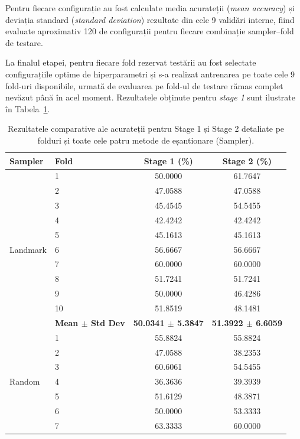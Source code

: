 Pentru fiecare configurație au fost calculate media acurateții (\textit{mean accuracy}) și deviația standard (\textit{standard deviation}) rezultate din cele 9 validări interne, fiind evaluate aproximativ 120 de configurații pentru fiecare combinație sampler--fold de testare.

La finalul etapei, pentru fiecare fold rezervat testării au fost selectate configurațiile optime de hiperparametri și s-a realizat antrenarea pe toate cele 9 fold-uri disponibile, urmată de evaluarea pe fold-ul de testare rămas complet nevăzut până în acel moment. Rezultatele obținute pentru \textit{stage 1} sunt ilustrate în Tabela~\ref{tab:combined_stages_results}.

\begin{table}[htbp]
	\centering
	\caption{Rezultatele comparative ale acurateții pentru Stage 1 și Stage 2 detaliate pe folduri și toate cele patru metode de eșantionare (Sampler).}
	\label{tab:combined_stages_results}
	\small
	\begin{tabular}{llcc}
		\toprule
		\textbf{Sampler} & \textbf{Fold} & \textbf{Stage 1 (\%)} & \textbf{Stage 2 (\%)} \\
		\midrule
		\multirow{11}{*}{Landmark} 
		& 1  & 50.0000 & 61.7647 \\
		& 2  & 47.0588 & 47.0588 \\
		& 3  & 45.4545 & 54.5455 \\
		& 4  & 42.4242 & 42.4242 \\
		& 5  & 45.1613 & 45.1613 \\
		& 6  & 56.6667 & 56.6667 \\
		& 7  & 60.0000 & 60.0000 \\
		& 8  & 51.7241 & 51.7241 \\
		& 9  & 50.0000 & 46.4286 \\
		& 10 & 51.8519 & 48.1481 \\
		\cmidrule{2-4}
		& \textbf{Mean $\pm$ Std Dev} & \textbf{50.0341 $\pm$ 5.3847} & \textbf{51.3922 $\pm$ 6.6059} \\
		\midrule
		\multirow{11}{*}{Random} 
		& 1  & 55.8824 & 55.8824 \\
		& 2  & 47.0588 & 38.2353 \\
		& 3  & 60.6061 & 54.5455 \\
		& 4  & 36.3636 & 39.3939 \\
		& 5  & 51.6129 & 48.3871 \\
		& 6  & 50.0000 & 53.3333 \\
		& 7  & 63.3333 & 60.0000 \\

\end{tabular}
\end{table}
